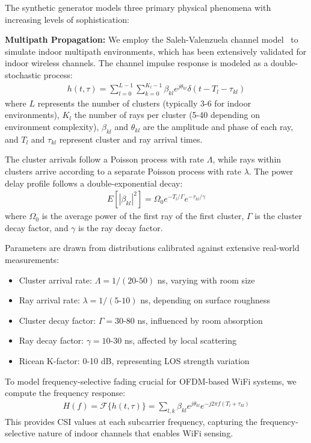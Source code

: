 \documentclass[journal]{IEEEtran}
\begin{document}
The synthetic generator models three primary physical phenomena with increasing levels of sophistication:

\textbf{Multipath Propagation:} We employ the Saleh-Valenzuela channel model~\cite{saleh1987statistical} to simulate indoor multipath environments, which has been extensively validated for indoor wireless channels. The channel impulse response is modeled as a double-stochastic process:
\begin{align}
h(t,\tau) = \sum_{l=0}^{L-1} \sum_{k=0}^{K_l-1} \beta_{kl} e^{j\theta_{kl}} \delta(t - T_l - \tau_{kl})
\end{align}
where $L$ represents the number of clusters (typically 3-6 for indoor environments), $K_l$ the number of rays per cluster (5-40 depending on environment complexity), $\beta_{kl}$ and $\theta_{kl}$ are the amplitude and phase of each ray, and $T_l$ and $\tau_{kl}$ represent cluster and ray arrival times. 

The cluster arrivals follow a Poisson process with rate $\Lambda$, while rays within clusters arrive according to a separate Poisson process with rate $\lambda$. The power delay profile follows a double-exponential decay:
\begin{align}
E[|\beta_{kl}|^2] = \Omega_0 e^{-T_l/\Gamma} e^{-\tau_{kl}/\gamma}
\end{align}
where $\Omega_0$ is the average power of the first ray of the first cluster, $\Gamma$ is the cluster decay factor, and $\gamma$ is the ray decay factor.

Parameters are drawn from distributions calibrated against extensive real-world measurements:
\begin{itemize}
\item Cluster arrival rate: $\Lambda = 1/(20\text{-}50)$ ns, varying with room size
\item Ray arrival rate: $\lambda = 1/(5\text{-}10)$ ns, depending on surface roughness
\item Cluster decay factor: $\Gamma = 30\text{-}80$ ns, influenced by room absorption
\item Ray decay factor: $\gamma = 10\text{-}30$ ns, affected by local scattering
\item Ricean K-factor: 0-10 dB, representing LOS strength variation
\end{itemize}

To model frequency-selective fading crucial for OFDM-based WiFi systems, we compute the frequency response:
\begin{align}
H(f) = \mathcal{F}\{h(t,\tau)\} = \sum_{l,k} \beta_{kl} e^{j\theta_{kl}} e^{-j2\pi f(T_l + \tau_{kl})}
\end{align}
This provides CSI values at each subcarrier frequency, capturing the frequency-selective nature of indoor channels that enables WiFi sensing.
\end{document}
